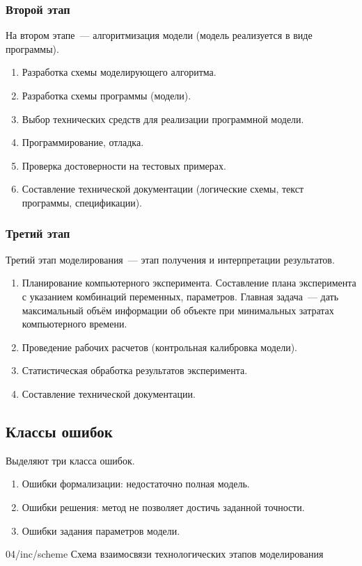 \subsubsection{Второй этап}

На втором этапе~--- алгоритмизация модели (модель реализуется в виде программы).

\begin{enumerate}
    \item Разработка схемы моделирующего алгоритма.
    \item Разработка схемы программы (модели).
    \item Выбор технических средств для реализации программной модели.
    \item Программирование, отладка.
    \item Проверка достоверности на тестовых примерах.
    \item Составление технической документации (логические схемы, текст программы, спецификации).
\end{enumerate}

\subsubsection{Третий этап}

Третий этап моделирования~--- этап получения и интерпретации результатов.

\begin{enumerate}
    \item Планирование компьютерного эксперимента. Составление плана эксперимента с указанием комбинаций переменных, параметров. Главная задача~--- дать максимальный объём информации об объекте при минимальных затратах компьютерного времени.
    \item Проведение рабочих расчетов (контрольная калибровка модели).
    \item Статистическая обработка результатов эксперимента.
    \item Составление технической документации.
\end{enumerate}

\subsection{Классы ошибок}

Выделяют три класса ошибок.

\begin{enumerate}
    \item Ошибки формализации: недостаточно полная модель.
    \item Ошибки решения: метод не позволяет достичь заданной точности.
    \item Ошибки задания параметров модели.
\end{enumerate}

\image
{\textwidth}
{04/inc/scheme}
{Схема взаимосвязи технологических этапов моделирования}